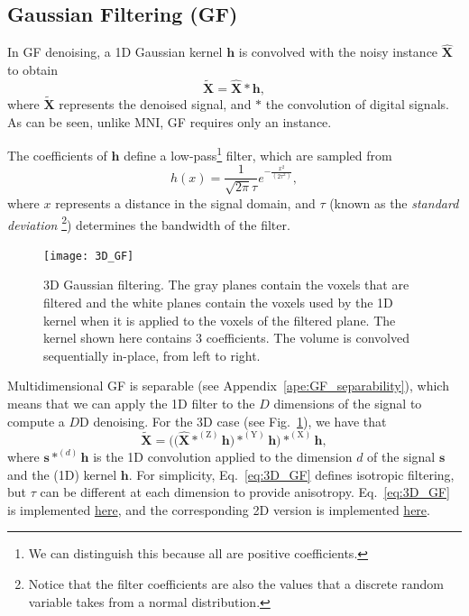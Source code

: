 \documentclass{article}
\begin{document}

\subsection{Gaussian Filtering (GF)}

In GF denoising, a 1D Gaussian kernel $\mathbf{h}$ is convolved with
the noisy instance $\hat{\mathbf{X}}$ to obtain
\begin{equation}
  \tilde{\mathbf{X}} = \hat{\mathbf{X}}*\mathbf{h},
  \label{eq:GF}
\end{equation}
where $\tilde{\mathbf{X}}$ represents the denoised signal, and $*$ the
convolution of digital signals. As can be seen, unlike MNI, GF
requires only an instance.

The coefficients of $\mathbf{h}$ define a low-pass\footnote{We can
  distinguish this because all are positive coefficients.}
filter, which are sampled from
\begin{equation}
  h(x) = \frac{1}{\sqrt{2\pi}\tau}e^{-\frac{{x}^2}{(2\tau^2)}},
  \label{eq:GK}
\end{equation}
where $x$ represents a distance in
the signal domain, and $\tau$ (known as the \emph{standard deviation}
\footnote{Notice that the filter coefficients are also the values that a
  discrete random variable takes from a normal distribution.})
determines the bandwidth of the filter.

\begin{figure}
  \centering
  \texttt{[image: 3D\_GF]}
  \caption{3D Gaussian filtering. The gray planes contain the voxels
    that are filtered and the white planes contain the voxels used by
    the 1D kernel when it is applied to the voxels of the filtered
    plane. The kernel shown here contains 3 coefficients. The volume
    is convolved sequentially in-place, from left to
    right.\label{fig:3D_GF}}
\end{figure}

Multidimensional GF is separable (see
Appendix~\ref{ape:GF_separability}), which means that we
can apply the 1D filter to the $D$ dimensions of the signal to compute
a $D$D denoising. For the 3D case (see Fig.~\ref{fig:3D_GF}), we have
that
\begin{equation}
  \tilde{\mathbf{X}} = \Big(\big(\hat{\mathbf X}*^{(\text{Z})}{\mathbf h}\big)*^{(\text{Y})}{\mathbf h}\Big)*^{(\text{X})}{\mathbf h},
    \label{eq:3D_GF}
\end{equation}
where ${\mathbf s}*^{(d)}{\mathbf h}$ is the 1D convolution applied to
the dimension $d$ of the signal ${\mathbf s}$ and the (1D) kernel
${\mathbf h}$. For simplicity, Eq.~\ref{eq:3D_GF} defines isotropic
filtering, but $\tau$ can be different at each dimension to provide
anisotropy. Eq.~\ref{eq:3D_GF} is implemented
\href{https://github.com/vicente-gonzalez-ruiz/denoising/blob/main/src/denoising/volume/gaussian.py}{here},
and the corresponding 2D version is implemented
\href{https://github.com/vicente-gonzalez-ruiz/denoising/blob/main/src/denoising/image/gaussian.py}{here}.
\end{document}
